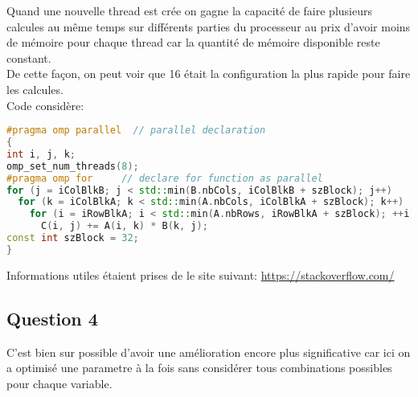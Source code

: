 \documentclass{article}
\begin{document}
\begin{resolution}
Quand une nouvelle thread est crée on gagne la capacité de faire plusieurs calcules au même temps sur différents parties du processeur au prix d'avoir moins de mémoire pour chaque thread car la quantité de mémoire disponible reste constant.\\

De cette façon, on peut voir que 16 était la configuration la plus rapide pour faire les calcules.\\

Code considère:
\begin{scriptsize}
    \mycode
    \begin{lstlisting}[language=C++]
#pragma omp parallel  // parallel declaration
{
int i, j, k;
omp_set_num_threads(8);
#pragma omp for     // declare for function as parallel
for (j = iColBlkB; j < std::min(B.nbCols, iColBlkB + szBlock); j++)
  for (k = iColBlkA; k < std::min(A.nbCols, iColBlkA + szBlock); k++)
    for (i = iRowBlkA; i < std::min(A.nbRows, iRowBlkA + szBlock); ++i)
      C(i, j) += A(i, k) * B(k, j);
const int szBlock = 32;
}
    \end{lstlisting}
\end{scriptsize}

Informations utiles étaient prises de le site suivant: \href{https://stackoverflow.com/questions/22634121/openmp-c-matrix-multiplication-run-slower-in-parallel}{https://stackoverflow.com/}
\end{resolution}

\subsection*{Question 4}
\begin{resolution}
    C'est bien sur possible d'avoir une amélioration encore plus significative car ici on a optimisé une parametre à la fois sans considérer tous combinations possibles pour chaque variable.
\end{resolution}
\end{document}
